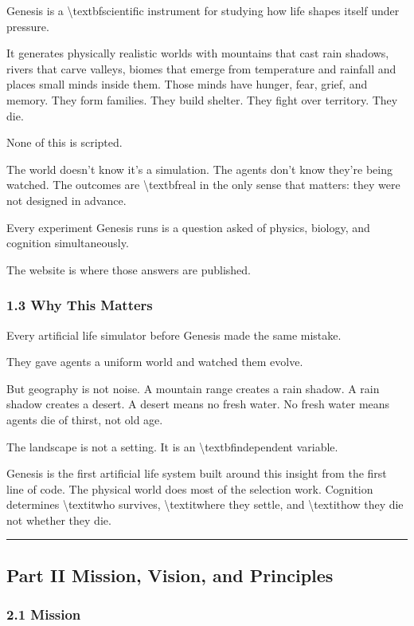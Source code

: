 \documentclass[11pt,a4paper]{article}
\begin{document}
Genesis is a \textbackslash{}textbf{scientific instrument for studying how life shapes itself under pressure}.

It generates physically realistic worlds  with mountains that cast rain shadows, rivers that carve valleys, biomes that emerge from temperature and rainfall  and places small minds inside them. Those minds have hunger, fear, grief, and memory. They form families. They build shelter. They fight over territory. They die.

None of this is scripted.

The world doesn't know it's a simulation. The agents don't know they're being watched. The outcomes are \textbackslash{}textbf{real} in the only sense that matters: they were not designed in advance.

Every experiment Genesis runs is a question asked of physics, biology, and cognition simultaneously.

The website is where those answers are published.

\subsubsection*{1.3 Why This Matters}

Every artificial life simulator before Genesis made the same mistake.

They gave agents a uniform world and watched them evolve.

But geography is not noise. A mountain range creates a rain shadow. A rain shadow creates a desert. A desert means no fresh water. No fresh water means agents die of thirst, not old age.

The landscape is not a setting. It is an \textbackslash{}textbf{independent variable}.

Genesis is the first artificial life system built around this insight from the first line of code. The physical world does most of the selection work. Cognition determines \textbackslash{}textit{who} survives, \textbackslash{}textit{where} they settle, and \textbackslash{}textit{how} they die  not whether they die.

\noindent\rule{\textwidth}{0.4pt}

\subsection*{Part II  Mission, Vision, and Principles}

\subsubsection*{2.1 Mission}
\end{document}
